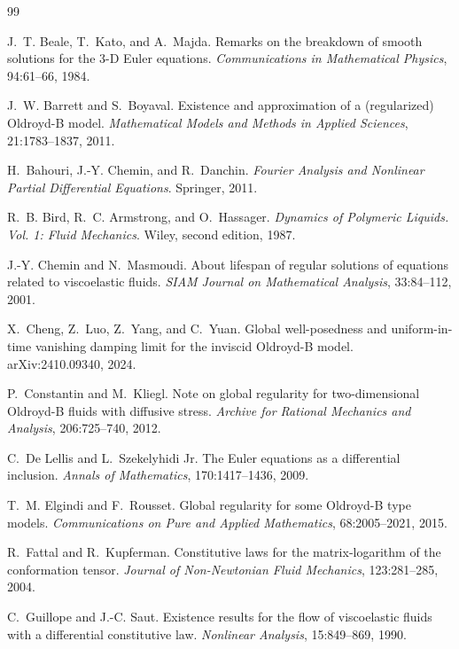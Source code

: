 \documentclass[11pt]{article}
\numberwithin{equation}{section}
\begin{document}
\begin{thebibliography}{99}

J.~T. Beale, T.~Kato, and A.~Majda.
\newblock Remarks on the breakdown of smooth solutions for the 3-D Euler
equations.
\newblock \emph{Communications in Mathematical Physics}, 94:61--66, 1984.

J.~W. Barrett and S.~Boyaval.
\newblock Existence and approximation of a (regularized) Oldroyd-B model.
\newblock \emph{Mathematical Models and Methods in Applied Sciences},
21:1783--1837, 2011.

H.~Bahouri, J.-Y. Chemin, and R.~Danchin.
\newblock \emph{Fourier Analysis and Nonlinear Partial Differential
Equations}.
\newblock Springer, 2011.

R.~B. Bird, R.~C. Armstrong, and O.~Hassager.
\newblock \emph{Dynamics of Polymeric Liquids. Vol. 1: Fluid Mechanics}.
\newblock Wiley, second edition, 1987.

J.-Y. Chemin and N.~Masmoudi.
\newblock About lifespan of regular solutions of equations related to
viscoelastic fluids.
\newblock \emph{SIAM Journal on Mathematical Analysis}, 33:84--112, 2001.

X.~Cheng, Z.~Luo, Z.~Yang, and C.~Yuan.
\newblock Global well-posedness and uniform-in-time vanishing damping limit for
the inviscid Oldroyd-B model.
\newblock arXiv:2410.09340, 2024.

P.~Constantin and M.~Kliegl.
\newblock Note on global regularity for two-dimensional Oldroyd-B fluids with
diffusive stress.
\newblock \emph{Archive for Rational Mechanics and Analysis}, 206:725--740,
2012.

C.~De Lellis and L.~Szekelyhidi Jr.
\newblock The Euler equations as a differential inclusion.
\newblock \emph{Annals of Mathematics}, 170:1417--1436, 2009.

T.~M. Elgindi and F.~Rousset.
\newblock Global regularity for some Oldroyd-B type models.
\newblock \emph{Communications on Pure and Applied Mathematics},
68:2005--2021, 2015.

R.~Fattal and R.~Kupferman.
\newblock Constitutive laws for the matrix-logarithm of the conformation tensor.
\newblock \emph{Journal of Non-Newtonian Fluid Mechanics}, 123:281--285, 2004.

C.~Guillope and J.-C. Saut.
\newblock Existence results for the flow of viscoelastic fluids with a
differential constitutive law.
\newblock \emph{Nonlinear Analysis}, 15:849--869, 1990.


\end{thebibliography}
\end{document}

